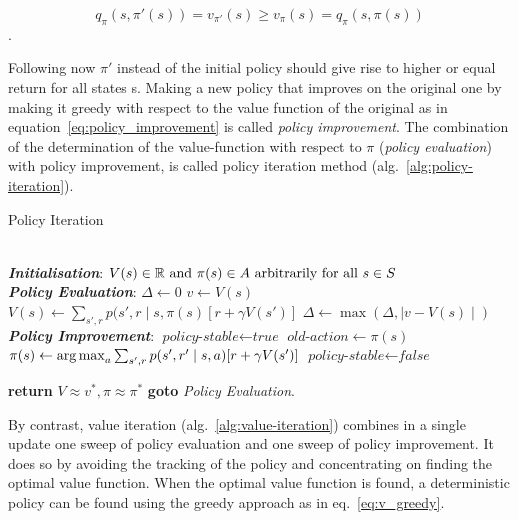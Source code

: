  $$q_{\pi}(s, \pi'(s)) = v_{\pi'}(s) \geq v_{\pi}(s) = q_{\pi}(s, \pi(s))$$. 
 
Following now $\pi'$ instead of the initial policy should give rise to higher or equal return for all states s. Making a new policy that improves on the original one by making it greedy with respect to the value function of the original as in equation~\ref{eq:policy_improvement} is called \textit{policy improvement}. The combination of the determination of the value-function with respect to $\pi$ (\textit{policy evaluation}) with policy improvement, is called policy iteration method (alg.~\ref{alg:policy-iteration}). 

\begin{algorithm}[H]
\caption{Policy Iteration \cite{sutton_reinforcement_1998}}
\label{alg:policy-iteration}
\begin{algorithmic}
\\
\BState \textbf{\emph{Initialisation}}:
	\State $V(s) \in \mathbb{R} \textrm{ and } \pi(s) \in A \textrm{ arbitrarily for all } s \in S$
\\
\BState \textbf{\emph{Policy Evaluation}}:
	\Repeat
		\State $\Delta \gets 0$
			\State $v \gets V(s)$
 \State $V(s) \gets \sum_{s', r} p(s', r \mid s,\pi(s)[r + \gamma V(s')]$
			\State $\Delta \gets \max(\Delta, \mid v - V(s)\mid)$
		\EndFor
 \Until{$\Delta < \Theta$}
\\
\BState \textbf{\emph{Policy Improvement}}:
 \State $\textit{policy-stable}\gets \textit{true}$
 \State $\textit{old-action}\gets \pi(s)$
 \State $\pi(s) \gets \operatorname*{arg\,max}_a \sum_{s', r} p(s', r' \mid s,a)[r + \gamma V(s')]$
 $\textit{policy-stable}\gets \textit{false}$
 \EndIf
 \EndFor

 \State \textbf{return} $V \approx v^*, \pi \approx \pi^*$ 
 \Else
 \State \textbf{goto} \emph{Policy Evaluation}.
 \EndIf
\end{algorithmic}
\end{algorithm}


By contrast, value iteration (alg.~\ref{alg:value-iteration}) combines in a single update one sweep of policy evaluation and one sweep of policy improvement. It does so by avoiding the tracking of the policy and concentrating on finding the optimal value function. When the optimal value function is found, a deterministic policy can be found using the greedy approach as in eq.~\ref{eq:v_greedy}.

